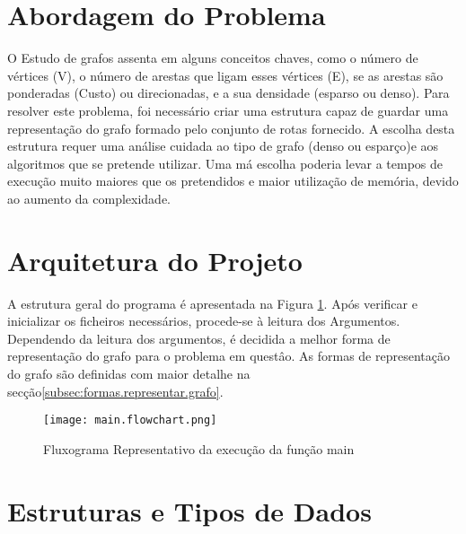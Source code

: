 \documentclass[14pt]{article}
\begin{document}
    \section{Abordagem do Problema}\label{sec:abordagem.problema}
    O Estudo de grafos assenta em alguns conceitos chaves, como o número de vértices (V), o número de arestas que ligam
    esses vértices (E), se as arestas são ponderadas (Custo) ou direcionadas, e a sua densidade (esparso ou denso).
    Para resolver este problema, foi necessário criar uma estrutura capaz de guardar uma representação do grafo formado
    pelo conjunto de rotas fornecido.
    A escolha desta estrutura requer uma análise cuidada ao tipo de grafo (denso ou esparço)e aos algoritmos que se
    pretende utilizar.
    Uma má escolha poderia levar a tempos de execução muito maiores que os pretendidos e maior utilização de memória,
    devido ao aumento da complexidade.

    \section{Arquitetura do Projeto}\label{arquitetura.projeto}
    A estrutura geral do programa é apresentada na Figura \ref{fig:main.flowchart}.
    Após verificar e inicializar os ficheiros necessários, procede-se à leitura dos Argumentos.
    Dependendo da leitura dos argumentos, é decidida a melhor forma de representação do grafo para o problema
    em questâo.
    As formas de representação do grafo são definidas com maior detalhe na secção\ref{subsec:formas.representar.grafo}.
\vfill
    \begin{figure}[H]
        \centering
        \label{fig:main.flowchart}
        \texttt{[image: main.flowchart.png]}
        \caption{Fluxograma Representativo da execução da função main}
    \end{figure}
\vfill
    \newpage

    \section{Estruturas e Tipos de Dados}\label{sec:estruturas.tipos.dados}
\end{document}
